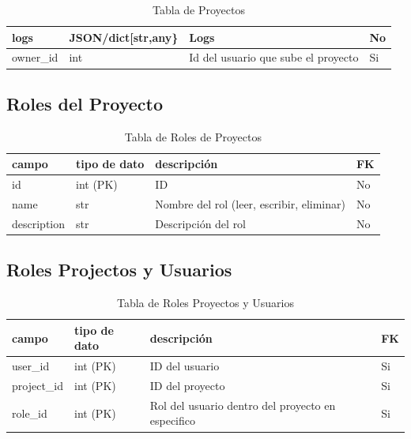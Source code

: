 \begin{table}[H]
\begin{tabular}{|l|l|l|l|}
        logs           & JSON/dict{[}str,any\} & Logs                                                                                                                              & No \\ \hline
        owner\_id      & int                   & Id del usuario que sube el proyecto                                                                                               & Si \\ \hline
    \end{tabular}
    \caption{Tabla de Proyectos}
    \label{tab:db-projects}
\end{table}

\subsection{Roles del Proyecto}
\begin{table}[H]
    \begin{tabular}{|l|l|l|l|}
        \hline
        campo       & tipo de dato & descripción                               & FK \\ \hline
        id          & int (PK)     & ID                                        & No \\ \hline
        name        & str          & Nombre del rol (leer, escribir, eliminar) & No \\ \hline
        description & str          & Descripción del rol                       & No \\ \hline
    \end{tabular}
    \caption{Tabla de Roles de Proyectos}
    \label{tab:db-role_projects}
\end{table}
\subsection{Roles Projectos y Usuarios}
\begin{table}[H]
    \begin{tabular}{|l|l|l|l|}
    \hline
    campo       & tipo de dato & descripción                                       & FK \\ \hline
    user\_id    & int (PK)     & ID del usuario                                    & Si \\ \hline
    project\_id & int (PK)     & ID del proyecto                                   & Si \\ \hline
    role\_id    & int (PK)     & Rol del usuario dentro del proyecto en especifico & Si \\ \hline
    \end{tabular}
    \caption{Tabla de Roles Proyectos y Usuarios}
    \label{tab:db-role_projects_users}
    \end{table}


